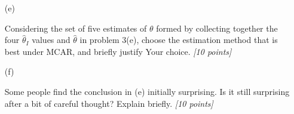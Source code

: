 \documentclass[12pt]{article}
\begin{document}
\begin{itemize}
\begin{itemize}

\item[(e)]

Considering the set of five estimates of $\theta$ formed by collecting together the four 
$\hat{ \theta }_I$ values and $\hat{ \theta }$ in problem 3(e), choose the estimation method that is best under MCAR, and briefly justify Your choice. \textit{[10 points]}

\end{itemize}

\newpage

\begin{itemize}

\item[(f)]

Some people find the conclusion in (e) initially surprising. Is it still surprising after a bit of careful thought? Explain briefly. \textit{[10 points]}

\vspace*{1.0in}

\end{itemize}

\end{itemize}
\end{document}
